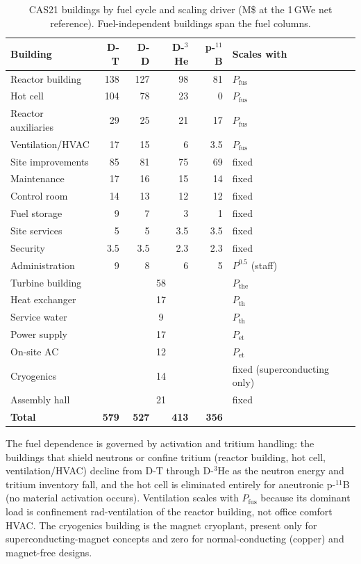 \documentclass{article}
\begin{document}
\begin{table}[htbp]
\caption{CAS21 buildings by fuel cycle and scaling driver (M\$ at the
1\,GWe net reference). Fuel-independent buildings span the fuel columns.}
\label{tab:cas21-buildings}
\centering
\small
\begin{tabular}{lrrrrl}
\toprule
Building & D-T & D-D & D-${}^3$He & p-${}^{11}$B & Scales with \\
\midrule
Reactor building & 138 & 127 & 98 & 81 & $P_{\text{fus}}$ \\
Hot cell & 104 & 78 & 23 & 0 & $P_{\text{fus}}$ \\
Reactor auxiliaries & 29 & 25 & 21 & 17 & $P_{\text{fus}}$ \\
Ventilation/HVAC & 17 & 15 & 6 & 3.5 & $P_{\text{fus}}$ \\
Site improvements & 85 & 81 & 75 & 69 & fixed \\
Maintenance & 17 & 16 & 15 & 14 & fixed \\
Control room & 14 & 13 & 12 & 12 & fixed \\
Fuel storage & 9 & 7 & 3 & 1 & fixed \\
Site services & 5 & 5 & 3.5 & 3.5 & fixed \\
Security & 3.5 & 3.5 & 2.3 & 2.3 & fixed \\
Administration & 9 & 8 & 6 & 5 & $P^{0.5}$ (staff) \\
\midrule
Turbine building & \multicolumn{4}{c}{58} & $P_{\text{the}}$ \\
Heat exchanger & \multicolumn{4}{c}{17} & $P_{\text{th}}$ \\
Service water & \multicolumn{4}{c}{9} & $P_{\text{th}}$ \\
Power supply & \multicolumn{4}{c}{17} & $P_{\text{et}}$ \\
On-site AC & \multicolumn{4}{c}{12} & $P_{\text{et}}$ \\
Cryogenics & \multicolumn{4}{c}{14} & fixed (superconducting only) \\
Assembly hall & \multicolumn{4}{c}{21} & fixed \\
\midrule
\textbf{Total} & \textbf{579} & \textbf{527} & \textbf{413} & \textbf{356} & \\
\bottomrule
\end{tabular}
\end{table}

The fuel dependence is governed by activation and tritium handling: the
buildings that shield neutrons or confine tritium (reactor building, hot
cell, ventilation/HVAC) decline from D-T through D-${}^3$He as the neutron
energy and tritium inventory fall, and the hot cell is eliminated entirely for
aneutronic p-${}^{11}$B (no material activation occurs). Ventilation scales with
$P_{\text{fus}}$ because its dominant load is confinement rad-ventilation of
the reactor building, not office comfort HVAC. The cryogenics building is
the magnet cryoplant, present only for superconducting-magnet concepts and
zero for normal-conducting (copper) and magnet-free designs.
\end{document}
